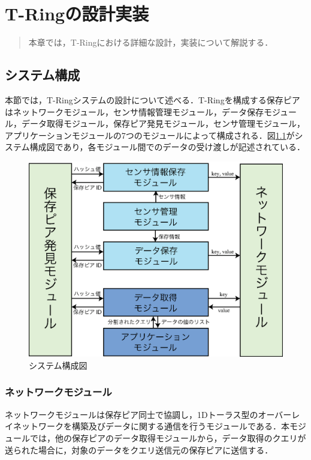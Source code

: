 \chapter{T-Ringの設計実装}
\begin{large}
\begin{quote}
本章では，T-Ringにおける詳細な設計，実装について解説する．
\end{quote}
\end{large}
\clearpage

\section{システム構成}
本節では，T-Ringシステムの設計について述べる．T-Ringを構成する保存ピアはネットワークモジュール，センサ情報管理モジュール，データ保存モジュール，データ取得モジュール，保存ピア発見モジュール，センサ管理モジュール，アプリケーションモジュールの7つのモジュールによって構成される．図\ref{fig:sysconf}がシステム構成図であり，各モジュール間でのデータの受け渡しが記述されている．

\begin{figure}[htbp]
 \begin{center}
  \includegraphics[width=130mm]{./images/sysconf.eps}
 \end{center}
 \caption{システム構成図}
 \label{fig:sysconf}
\end{figure}

\subsection{ネットワークモジュール}
ネットワークモジュールは保存ピア同士で協調し，1Dトーラス型のオーバーレイネットワークを構築及びデータに関する通信を行うモジュールである．本モジュールでは，他の保存ピアのデータ取得モジュールから，データ取得のクエリが送られた場合に，対象のデータをクエリ送信元の保存ピアに送信する．


